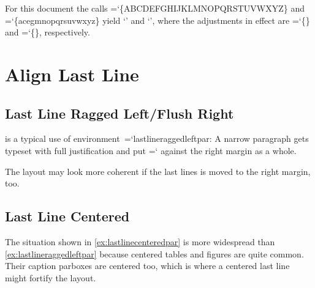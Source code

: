 \documentclass[a4paper]{article}
\def\xsfdefault{\relax}
\let\xsf=\sf
\let\xsfdefault=\sfdefault
\def\xsfdefault{Nunito-TOsF}
\def\xsf{\let\sfdefault=\xsfdefault\sf}
\def\xsfdefault{opensans-TLF}
\def\xsf{\let\sfdefault=\xsfdefault\sf}
\def\xsfdefault{NotoSans-TLF}
\def\xsf{\let\sfdefault=\xsfdefault\sf}
\def\xsfdefault{Roboto-LF}
\def\xsf{\let\sfdefault=\xsfdefault\sf}
\def\xsfdefault{MontserratAlternates-LF}
\def\xsf{\let\sfdefault=\xsfdefault\sf}
\def\xsfdefault{Inter-LF}
\def\xsf{\let\sfdefault=\xsfdefault\sf}
\newcommand*{\code}[1]{{\ttfamily\hyphenchar\font=`\-\relax #1}}
\newcommand*{\sample}[1]{\mbox{`\texttt{#1}'}}
\newlength{\examplewidth}
\newcommand*{\texbookparfillskipsample}
            {We still haven't discussed the special trick that allows the final line of a paragraph
             to be shorter than the others.  Just before \TeX{} begins to choose breakpoints,
             it does two important things: [\dots\itcorr{-4}]}
\newcommand*{\texbookparfillskipsamplecredits}
            {\medskip\noindent
             \textsl{The sample text was taken from The~\TeX{}book~\cite[p.~99n]{knuth:1986}.}}
\newcommand*{\examplepreset}{\microtypesetup{activate=false}}
\newcommand*{\examplesetup}{\frenchspacing\xsf\small\fussy}
\newcommand*{\exampleparbox}[2][n/a]
            {\begin{typoginspect}{#1}
               \examplepreset
               \parbox[t]{\examplewidth}{\examplesetup #2}%
             \end{typoginspect}}
\def\fontnameandweightinfo#1{%
  {\def\projectoutfontname##1-##2-##3\relax{##1~\lowercase{##2}}%
   \global\expandafter\edef\csname#1\endcsname{\expandafter\projectoutfontname\fontname\font\relax}}}
\newcommand*{\examplefontinformation}
            {\smallskip
             \examplesetup
             \fontnameandweightinfo{exfontnameinfo}%
             \fontsizeinfo{exfontsizeinfo}%
             The font used in this example is \exfontnameinfo, \exfontsizeinfo*.}
\begin{document}
For this document the calls
\code{\string\typoguppercaseadjustcheck\{ABC\-DEF\-GHI\-JKL\-MNO\-PQR\-STU\-VWX\-YZ\}} and
\code{\string\typoglowercaseadjustcheck\{ace\-gmn\-opq\-rsu\-vwx\-yz\}} yield
\sample{} and
\sample{}, where the adjustments in effect are
\code{\{\}} and
\code{\{\}}, respectively.

\clearpage
\section{Align Last Line}

\subsection{Last Line Ragged Left/Flush Right}

 is a typical use of environment~\code{lastlineraggedleftpar}:
A narrow paragraph gets typeset with full justification
and put \code{\string\flushright} against the right margin as a whole.

The layout may look more coherent if the last lines is moved to the right margin, too.


\subsection{Last Line Centered}

The situation shown in \cref{ex:lastlinecenteredpar} is
more widespread than \cref{ex:lastlineraggedleftpar}
because centered tables and figures are quite common.
Their caption parboxes are centered too,
which is where a centered last line might fortify the layout.
\end{document}
